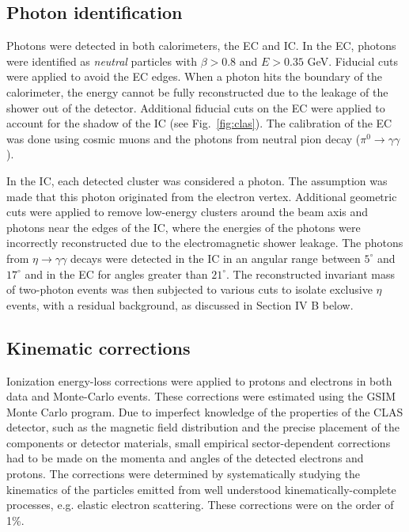 \documentclass[prc,aps,floatfix,showpacs,showkeys,twocolumn,superscriptaddress,letterpaper,10pt]{revtex4-1}
\begin{document}
\subsection{Photon identification} 

Photons were detected in both calorimeters, the EC  and IC. 
In the EC, photons  were identified as {\it neutral} particles  with $\beta>0.8$ and $E>0.35$ GeV. 
Fiducial cuts were applied to avoid  the EC  edges. When a photon hits the boundary of the calorimeter, the energy cannot be fully reconstructed due to the leakage of the shower out of the detector.
Additional fiducial cuts on the EC  were applied to account for the shadow of the IC  (see Fig.~\ref{fig:clas}). 
The  calibration of the EC  was done using cosmic muons and  the photons from neutral pion decay ($\pi^0\to\gamma\gamma$).  


In the IC,   each detected cluster was considered  a photon. The assumption was made that this photon originated from the electron vertex. Additional geometric cuts were applied to remove low-energy clusters around the beam axis and photons near the edges of the IC, where the energies of the photons were incorrectly reconstructed due to the electromagnetic shower leakage.
The photons from $\eta\to \gamma\gamma$ decays were detected in the IC  in an angular range between $5^\circ$  and $17^\circ$   and in the EC   for angles greater than $21^\circ$. 
The reconstructed invariant mass of two-photon events was then subjected to various cuts to isolate exclusive $\eta$ events, with a  residual background, as discussed in 
Section IV B below.  

\subsection{Kinematic corrections}
Ionization energy-loss corrections were applied to  protons and electrons in both data and Monte-Carlo events. These corrections were estimated using the GSIM Monte Carlo program.
Due to imperfect knowledge of the properties of the CLAS detector, such as the magnetic field distribution and the precise  placement of the components or detector materials, small empirical sector-dependent corrections had to be made on the momenta and angles of the detected electrons and protons. The corrections were determined by systematically studying the kinematics of the particles emitted from well understood kinematically-complete processes, e.g. elastic electron scattering. These corrections were on the order of 1\%.
\end{document}
